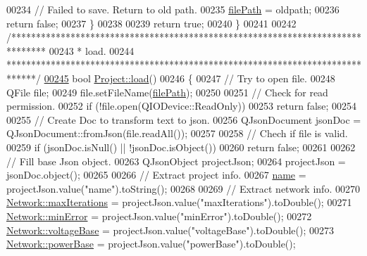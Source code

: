 \begin{DoxyCode}
00234     \textcolor{comment}{// Failed to save. Return to old path.}
00235     \hyperlink{class_project_a79f30adcefd0b72bd4ac7db724bc9531}{filePath} = oldpath;
00236     \textcolor{keywordflow}{return} \textcolor{keyword}{false};
00237   \}
00238 
00239   \textcolor{keywordflow}{return} \textcolor{keyword}{true};
00240 \}
00241 
00242 \textcolor{comment}{/*******************************************************************************}
00243 \textcolor{comment}{ * load.}
00244 \textcolor{comment}{ ******************************************************************************/}
\hypertarget{project_8cpp_source_l00245}{}\hyperlink{class_project_a1e373892a0383371132ce68fa5f8813d}{00245} \textcolor{keywordtype}{bool} \hyperlink{class_project_a1e373892a0383371132ce68fa5f8813d}{Project::load}()
00246 \{
00247   \textcolor{comment}{// Try to open file.}
00248   QFile file;
00249   file.setFileName(\hyperlink{class_project_a79f30adcefd0b72bd4ac7db724bc9531}{filePath});
00250 
00251   \textcolor{comment}{// Check for read permission.}
00252   \textcolor{keywordflow}{if} (!file.open(QIODevice::ReadOnly))
00253     \textcolor{keywordflow}{return} \textcolor{keyword}{false};
00254 
00255   \textcolor{comment}{// Create Doc to transform text to json.}
00256   QJsonDocument jsonDoc = QJsonDocument::fromJson(file.readAll());
00257 
00258   \textcolor{comment}{// Chech if file is valid.}
00259   \textcolor{keywordflow}{if} (jsonDoc.isNull() || !jsonDoc.isObject())
00260     \textcolor{keywordflow}{return} \textcolor{keyword}{false};
00261 
00262   \textcolor{comment}{// Fill base Json object.}
00263   QJsonObject projectJson;
00264   projectJson = jsonDoc.object();
00265 
00266   \textcolor{comment}{// Extract project info.}
00267   \hyperlink{class_project_a82dd2d1bc38f9fd08c9a811fcaa76b38}{name} = projectJson.value(\textcolor{stringliteral}{"name"}).toString();
00268 
00269   \textcolor{comment}{// Extract network info.}
00270   \hyperlink{group___graphics_ga318dee060bc577eacd67d332efbbe1b2}{Network::maxIterations} = projectJson.value(\textcolor{stringliteral}{"maxIterations"}).toDouble();
00271   \hyperlink{group___graphics_gabcdc973129d3dda7572b7a1c388da1b5}{Network::minError} = projectJson.value(\textcolor{stringliteral}{"minError"}).toDouble();
00272   \hyperlink{group___graphics_ga7c1e79d9ac69df9a69f24eaf092fd5e5}{Network::voltageBase} = projectJson.value(\textcolor{stringliteral}{"voltageBase"}).toDouble();
00273   \hyperlink{group___graphics_ga74bb7aa495d422f1f092acdf958df989}{Network::powerBase} = projectJson.value(\textcolor{stringliteral}{"powerBase"}).toDouble();

\end{DoxyCode}
